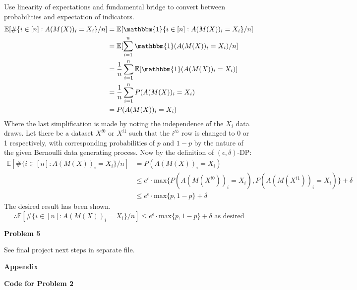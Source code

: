\documentclass[12pt]{article}
\begin{document}
Use linearity of expectations and fundamental bridge to convert between probabilities and expectation of indicators.
\begin{align*}
	\mathbb{E}[\#\{ i\in [n]: A(M(X))_i = X_i\} / n] &= \mathbb{E}[\mathbbm{1}\{ i\in [n]: A(M(X))_i = X_i\} / n]\\
	&= \mathbb{E}[\sum\limits^n_{i=1}\mathbbm{1}(A(M(X))_i = X_i) / n]\\
	&= \dfrac{1}{n}\sum\limits^n_{i=1}\mathbb{E}[\mathbbm{1}(A(M(X))_i = X_i)]\\
	&= \dfrac{1}{n}\sum\limits^n_{i=1}P(A(M(X))_i = X_i)\\
	&= P(A(M(X))_i = X_i)
\end{align*}
Where the last simplification is made by noting the independence of the $X_i$ data draws. Let there be a dataset $X^{i0}$ or $X^{i1}$ such that the $i^{th}$ row is changed to 0 or 1 respectively, with corresponding probabilities of $p$ and $1-p$ by the nature of the given Bernoulli data generating process. Now by the definition of $(\epsilon, \delta)$-DP:
\begin{align*}
	\mathbb{E}[\#\{ i\in [n]: A(M(X))_i = X_i\} / n] &= P(A(M(X))_i = X_i)\\
	&\leq e^{\epsilon}\cdot \text{max}\{P(A(M(X^{i0}))_i = X_i),P(A(M(X^{i1}))_i = X_i)\} + \delta\\
	&\leq e^{\epsilon}\cdot \text{max}\{p, 1-p\} + \delta
\end{align*}
The desired result has been shown.
\[\therefore\boxed{\mathbb{E}[\#\{ i\in [n]: A(M(X))_i = X_i\} / n] \leq e^{\epsilon} \cdot \text{max}\{p, 1-p\} + \delta}\text{ as desired}\]



\pagebreak

{\large\textbf{Problem 5}}

See final project next steps in separate file.

\pagebreak

{\large\textbf{Appendix}}

\textbf{Code for Problem 2}
\end{document}

